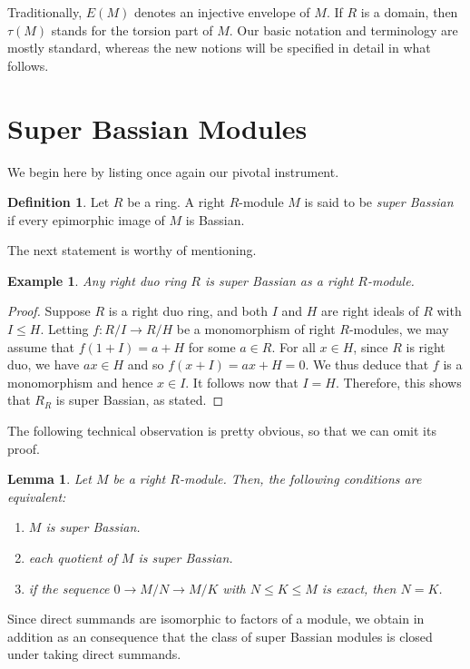 \documentclass{amsart}
\newtheorem{lm}[thm]{Lemma}
\newtheorem{exm}[thm]{Example}
\theoremstyle{definition}
\newtheorem*{definition}{Definition}
\begin{document}
Traditionally, $E(M)$ denotes an injective envelope of $M$. If $R$ is a domain, then $\tau(M)$ stands for the torsion part of $M$. Our basic notation and terminology are mostly standard, whereas the new notions will be specified in detail in what follows.

\section{Super Bassian Modules}

We begin here by listing once again our pivotal instrument.

\begin{definition} Let $R$ be a ring. A right $R$-module $M$ is said to be {\it super Bassian} if every epimorphic image of $M$ is Bassian.
\end{definition}

The next statement is worthy of mentioning.

\begin{exm}
Any right duo ring $R$ is super Bassian as a right $R$-module.
\end{exm}

\begin{proof}
Suppose $R$ is a right duo ring, and both $I$ and $H$ are right ideals of $R$ with $I\leq H$. Letting $f: R/I \to R/H$ be a monomorphism of right $R$-modules, we may assume that $f(1+I) = a + H$ for some $a \in R$. For all $x\in H$, since $R$ is right duo, we have $ax\in H$ and so $f(x+I)=ax+H=0$. We thus deduce that $f$ is a monomorphism and hence $x\in I$. It follows now that $I=H$. Therefore, this shows that $R_R$ is super Bassian, as stated.
\end{proof}

The following technical observation is pretty obvious, so that we can omit its proof.

\begin{lm}
Let $M$ be a right $R$-module. Then, the following conditions are equivalent:
\begin{enumerate}
\item $M$ is super Bassian.
\item each quotient of $M$ is super Bassian.
\item if the sequence $0\to M/N\to M/K$ with $N\leq K\leq M$ is exact, then $N=K$.
\end{enumerate}
\end{lm}

Since direct summands are isomorphic to factors of a module, we obtain in addition as an consequence that the class of super Bassian modules is closed under taking direct summands.
\end{document}

